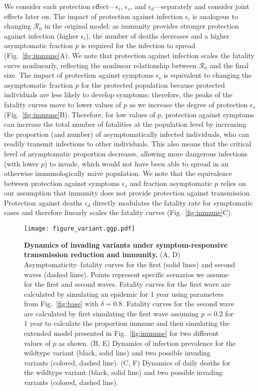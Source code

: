\documentclass[12pt]{article}
\newcommand{\fref}[1]{Fig.~\ref{fig:#1}}
\newcommand{\RR}{\ensuremath{{\mathcal R}}\xspace}
\begin{document}
We consider each protection effect---$\epsilon_i$, $\epsilon_s$, and $\epsilon_d$---separately and consider joint effects later on.
The impact of protection against infection $\epsilon_i$ is analogous to changing $\RR_0$ in the original model: as immunity provides stronger protection against infection (higher $\epsilon_i$), the number of deaths decreases and a higher asymptomatic fraction $p$ is required for the infection to spread (\fref{immune}A).
We note that protection against infection scales the fatality curve nonlinearly, reflecting the nonlinear relationship between $\RR_0$ and the final size.
The impact of protection against symptoms $\epsilon_s$ is equivalent to changing the asymptomatic fraction $p$ for the protected population because protected individuals are less likely to develop symptoms:
therefore, the peaks of the fatality curves move to lower values of $p$ as we increase the degree of protection $\epsilon_s$ (\fref{immune}B).
Therefore, for low values of $p$, protection against symptoms can increase the total number of fatalities at the population level by increasing the proportion (and number) of asymptomatically infected individuals, who can readily transmit infections to other individuals.
This also means that the critical level of asymptomatic proportion decreases, allowing more dangerous infections (with lower $p$) to invade, which would not have been able to spread in an otherwise immunologically naive population.
We note that the equivalence between protection against symptoms $\epsilon_s$ and fraction asymptomatic $p$ relies on our assumption that immunity does not provide protection against transmission.
Protection against deaths $\epsilon_d$ directly modulates the fatality rate for symptomatic cases and therefore linearly scales the fatality curves (\fref{immune}C).

\begin{figure}[!ht]
\texttt{[image: figure\_variant.ggp.pdf]}
\caption{
\textbf{Dynamics of invading variants under symptom-responsive transmission reduction and immunity.}
(A, D) Asymptomaticity--fatality curves for the first (solid lines) and second waves (dashed lines).
Points represent specific scenarios we assume for the first and second waves.
Fatality curves for the first wave are calculated by simulating an epidemic for 1 year using parameters from \fref{base} with $\delta=0.8$.
Fatality curves for the second wave are calculated by first simulating the first wave assuming $p=0.2$ for 1 year to calculate the proportion immune and then simulating the extended model presented in \fref{immune} for two different values of $p$ as shown.
(B, E) Dynamics of infection prevalence for the wildtype variant (black, solid line) and two possible invading variants (colored, dashed line).
(C, F) Dynamics of daily deaths for the wildtype variant (black, solid line) and two possible invading variants (colored, dashed line).
}
\label{fig:variant}
\end{figure}
\end{document}
